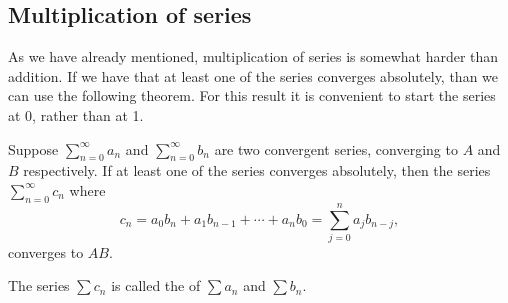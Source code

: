 \documentclass[12pt]{book}
\begin{document}
\subsection*{Multiplication of series}

As we have
already mentioned,
multiplication of series is somewhat harder than addition.
If we have that at least one of the series converges
absolutely, than we can use the following theorem.
For this result it is
convenient to start the series at 0, rather than at 1.

\begin{thm}
Suppose $\sum_{n=0}^\infty a_n$ and $\sum_{n=0}^\infty b_n$ are two convergent series, converging
to $A$ and $B$ respectively.
If at least one of the series
converges absolutely, then the series $\sum_{n=0}^\infty c_n$ where
\begin{equation*}
c_n = a_0 b_n + a_1 b_{n-1} + \cdots + a_n b_0 = \sum_{j=0}^n a_j b_{n-j} ,
\end{equation*}
converges to $AB$.
\end{thm}

The series $\sum c_n$ is called the \emph{} of
$\sum a_n$ and $\sum b_n$.
\end{document}
